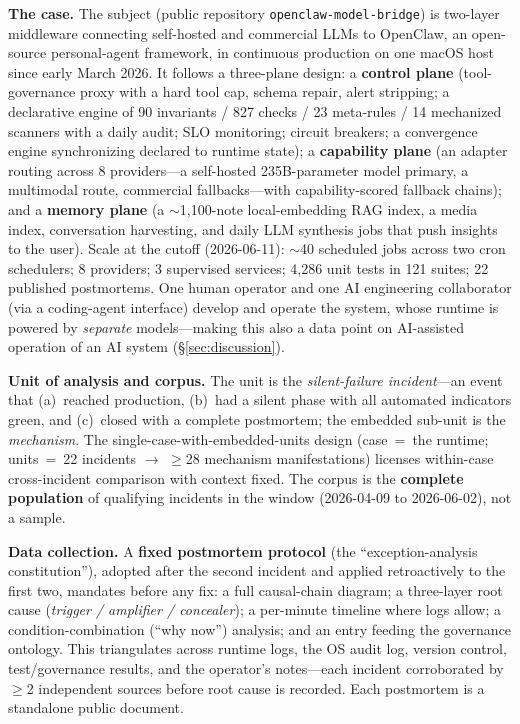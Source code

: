 \documentclass[conference]{IEEEtran}
\begin{document}
\textbf{The case.} The subject (public repository
\texttt{openclaw-model-bridge}) is two-layer middleware connecting
self-hosted and commercial LLMs to OpenClaw, an open-source personal-agent
framework, in continuous production on one macOS host since early March
2026. It follows a three-plane design: a \textbf{control plane}
(tool-governance proxy with a hard tool cap, schema repair, alert
stripping; a declarative engine of 90 invariants / 827 checks / 23
meta-rules / 14 mechanized scanners with a daily audit; SLO monitoring;
circuit breakers; a convergence engine synchronizing declared to runtime
state); a \textbf{capability plane} (an adapter routing across 8
providers---a self-hosted 235B-parameter model primary, a multimodal
route, commercial fallbacks---with capability-scored fallback chains); and
a \textbf{memory plane} (a $\sim$1{,}100-note local-embedding RAG index, a
media index, conversation harvesting, and daily LLM synthesis jobs that
push insights to the user). Scale at the cutoff (2026-06-11): $\sim$40
scheduled jobs across two cron schedulers; 8 providers; 3 supervised
services; 4{,}286 unit tests in 121 suites; 22 published postmortems. One
human operator and one AI engineering collaborator (via a coding-agent
interface) develop and operate the system, whose runtime is powered by
\emph{separate} models---making this also a data point on AI-assisted
operation of an AI system (\S\ref{sec:discussion}).

\textbf{Unit of analysis and corpus.} The unit is the
\emph{silent-failure incident}---an event that (a)~reached production,
(b)~had a silent phase with all automated indicators green, and (c)~closed
with a complete postmortem; the embedded sub-unit is the \emph{mechanism}.
The single-case-with-embedded-units design (case~=~the runtime;
units~=~22 incidents $\to$ $\geq$28 mechanism manifestations) licenses
within-case cross-incident comparison with context fixed. The corpus is
the \textbf{complete population} of qualifying incidents in the window
(2026-04-09 to 2026-06-02), not a sample.

\textbf{Data collection.} A \textbf{fixed postmortem protocol} (the
``exception-analysis constitution''), adopted after the second incident
and applied retroactively to the first two, mandates before any fix: a
full causal-chain diagram; a three-layer root cause (\emph{trigger /
amplifier / concealer}); a per-minute timeline where logs allow; a
condition-combination (``why now'') analysis; and an entry feeding the
governance ontology. This triangulates across runtime logs, the OS audit
log, version control, test/governance results, and the operator's
notes---each incident corroborated by $\geq$2 independent sources before
root cause is recorded. Each postmortem is a standalone public document.
\end{document}
